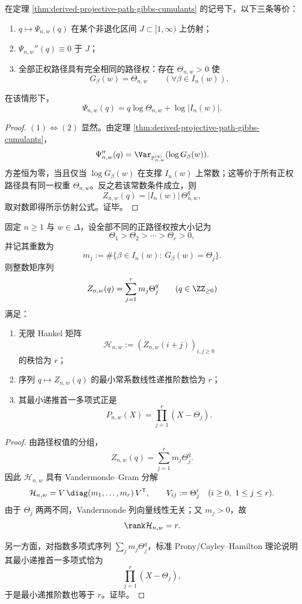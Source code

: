 \begin{corollary}[有限路径压力的仿射刚性]\label{cor:derived-projective-path-affine-rigidity}
在定理 \ref{thm:derived-projective-path-gibbs-cumulants} 的记号下，以下三条等价：
\begin{enumerate}
\normalfont
  \item \(q\mapsto \Psi_{n,w}(q)\) 在某个非退化区间 \(J\subset[1,\infty)\) 上仿射；
  \item \(\Psi_{n,w}''(q)\equiv 0\) 于 \(J\)；
  \item 全部正权路径具有完全相同的路径权：存在 \(\Theta_{n,w}>0\) 使
  \[
  G_\beta(w)=\Theta_{n,w}
  \qquad (\forall \beta\in I_n(w)).
  \]
\end{enumerate}
在该情形下，
\[
\Psi_{n,w}(q)=q\log\Theta_{n,w}+\log|I_n(w)|.
\]
\end{corollary}

\begin{proof}
\((1)\Leftrightarrow(2)\) 显然。由定理 \ref{thm:derived-projective-path-gibbs-cumulants}，
\[
\Psi_{n,w}''(q)=\Var_{\mathbb P_{n,w}^{(q)}}(\log G_\beta(w)).
\]
方差恒为零，当且仅当 \(\log G_\beta(w)\) 在支撑 \(I_n(w)\) 上常数；这等价于所有正权路径具有同一权重 \(\Theta_{n,w}\)。反之若该常数条件成立，则
\[
Z_{n,w}(q)=|I_n(w)|\,\Theta_{n,w}^q,
\]
取对数即得所示仿射公式。证毕。
\end{proof}

\begin{theorem}\label{thm:derived-projective-path-atomic-prony-rank}
固定 \(n\ge 1\) 与 \(w\in\Delta\)，设全部不同的正路径权按大小记为
\[
\Theta_1>\Theta_2>\cdots>\Theta_r>0,
\]
并记其重数为
\[
m_j:=\#\{\beta\in I_n(w):\ G_\beta(w)=\Theta_j\}.
\]
则整数矩序列
\[
Z_{n,w}(q)=\sum_{j=1}^{r}m_j\Theta_j^q
\qquad (q\in\ZZ_{\ge 0})
\]
满足：
\begin{enumerate}
\normalfont
  \item 无限 Hankel 矩阵
  \[
  \mathcal H_{n,w}:=(Z_{n,w}(i+j))_{i,j\ge 0}
  \]
  的秩恰为 \(r\)；
  \item 序列 \(q\mapsto Z_{n,w}(q)\) 的最小常系数线性递推阶数恰为 \(r\)；
  \item 其最小递推首一多项式正是
  \[
  P_{n,w}(X)=\prod_{j=1}^{r}(X-\Theta_j).
  \]
\end{enumerate}
\end{theorem}

\begin{proof}
由路径权值的分组，
\[
Z_{n,w}(q)=\sum_{j=1}^{r}m_j\Theta_j^q.
\]
因此 \(\mathcal H_{n,w}\) 具有 Vandermonde--Gram 分解
\[
\mathcal H_{n,w}
=
V\,\diag(m_1,\dots,m_r)\,V^{\mathsf T},
\qquad
V_{ij}:=\Theta_j^i\quad(i\ge 0,\ 1\le j\le r).
\]
由于 \(\Theta_j\) 两两不同，Vandermonde 列向量线性无关；又 \(m_j>0\)，故
\[
\rank \mathcal H_{n,w}=r.
\]

另一方面，对指数多项式序列 \(\sum_jm_j\Theta_j^q\)，标准 Prony/Cayley--Hamilton 理论说明其最小递推首一多项式恰为
\[
\prod_{j=1}^{r}(X-\Theta_j),
\]
于是最小递推阶数也等于 \(r\)。证毕。
\end{proof}

